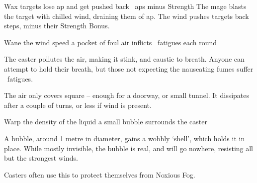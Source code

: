   {\mAir}%
  {Wax}%
  {}%
  {}%
  {targets lose  \gls{ap} and get pushed back ~\glspl{ap} minus Strength}%
  {
    The mage blasts the target with chilled wind, draining them of  \gls{ap}.
    The wind pushes targets back  steps, minus their Strength Bonus.
  }

  {\mAir}%
  {Wane}%
  {}%
  {the wind speed}%
  {a pocket of foul air inflicts ~\glspl{fatigue} each round}%
  {
    The caster pollutes the air, making it stink, and caustic to breath.
    Anyone can attempt to hold their breath, but those not expecting the nauseating fumes suffer ~\glspl{fatigue}.

    The air only covers  square -- enough for a doorway, or small tunnel.
    It dissipates after a couple of turns, or less if wind is present.
  }

  {\mAir}%
  {Warp}%
  {}%
  {the density of the liquid}%
  {a small bubble surrounds the caster}%
  {
    A bubble, around 1 metre in diameter, gains a wobbly `shell', which holds it in place.
    While mostly invisible, the bubble is real, and will go nowhere, resisting all but the strongest winds.

    Casters often use this to protect themselves from Noxious Fog.
  }

